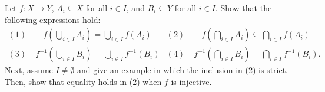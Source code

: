 \begin{problem}
Let $f \colon X\rightarrow Y$, $A_i \subseteq X$ for all $i\in I$, and $B_i \subseteq Y$ for all $i\in I$.
Show that the following expressions hold:
\begin{align*}
(1) & \;\;\;\:\, f \left( \bigcup_{i\in I} A_i \right) = \bigcup_{i\in I} f \left( A_i \right) &
(2) & \;\;\;\:\, f \left( \bigcap_{i\in I} A_i \right) \subseteq \bigcap_{i\in I} f \left( A_i \right) \\
(3) & \; f^{-1} \left( \bigcup_{i\in I} B_i \right) = \bigcup_{i\in I} f^{-1} \left( B_i \right) &
(4) & \; f^{-1} \left( \bigcap_{i\in I} B_i \right) = \bigcap_{i\in I} f^{-1} \left( B_i \right). 
\end{align*}
Next, assume $I\ne\emptyset$ and give an example in which the inclusion in (2) is strict.
Then, show that equality holds in (2) when $f$ is injective.
\end{problem}
